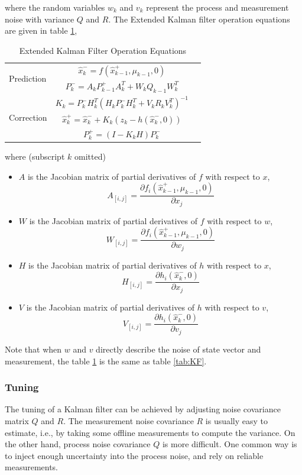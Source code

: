 \noindent where the random variables $w_k$ and $v_k$ represent the
process and measurement noise with variance $Q$ and $R$. The Extended
Kalman filter operation equations are given in table \ref{tab:EKF},

\begin{table}[H]
\caption{Extended Kalman Filter Operation Equations}
\label{tab:EKF}
\centering
\begin{tabular}{|l|c r|}
\hline
\multirow{2}{*}{Prediction} 
& $\hat{x}^-_k=f(\hat{x}^+_{k-1},\mu_{k-1},0)$ & \stepcounter{equation}\thetag{\theequation}\\
& $P^-_k = A_kP^+_{k-1}A_k^T+W_kQ_{k-1}W_k^T$ & \stepcounter{equation}\thetag{\theequation}\\
\hline
\multirow{3}{*}{Correction}
& $K_k=P^-_kH_k^T(H_kP^-_kH_k^T+V_kR_kV_k^T)^{-1}$  & \stepcounter{equation}\thetag{\theequation}\\
& $\hat{x}^+_k = \hat{x}^-_k+K_k(z_k-h(\hat{x}^-_k,0))$ & \stepcounter{equation}\thetag{\theequation}\\
& $P^+_k = (I-K_kH)P^-_k$ & \stepcounter{equation}\thetag{\theequation}\\
\hline
\end{tabular}
\end{table}
\FloatBarrier

\noindent where (subscript $k$ omitted)
\begin{itemize}
  \item $A$ is the Jacobian matrix of partial derivatives of $f$ with
  respect to $x$, $$A_{[i,j]}= \frac{\partial f_i(\hat{x}_{k-1}^+,
    \mu_{k-1}, 0)}{\partial x_j}$$
  \item $W$ is the Jacobian matrix of partial derivatives of $f$ with
  respect to $w$, $$W_{[i,j]}= \frac{\partial f_i(\hat{x}_{k-1}^+,
    \mu_{k-1}, 0)}{\partial w_j}$$
  \item $H$ is the Jacobian matrix of partial derivatives of $h$ with
  respect to $x$, $$H_{[i,j]}= \frac{\partial h_i(\hat{x}_k^-,
    0)}{\partial x_j}$$
  \item $V$ is the Jacobian matrix of partial derivatives of $h$ with
  respect to $v$, $$V_{[i,j]}= \frac{\partial
    h_i(\hat{x}_k^-,0)}{\partial v_j}$$
\end{itemize}

\noindent Note that when $w$ and $v$ directly describe the noise of
state vector and measurement, the table \ref{tab:EKF} is the same as
table \ref{tab:KF}.

\subsubsection{Tuning}
The tuning of a Kalman filter can be achieved by adjusting noise covariance
matrix $Q$ and $R$. The measurement noise covariance $R$ is usually
easy to estimate, i.e., by taking some offline measurements to compute
the variance. On the other hand, process noise covariance $Q$ is more
difficult. One common way is to inject enough uncertainty into the
process noise, and rely on reliable measurements.
 
